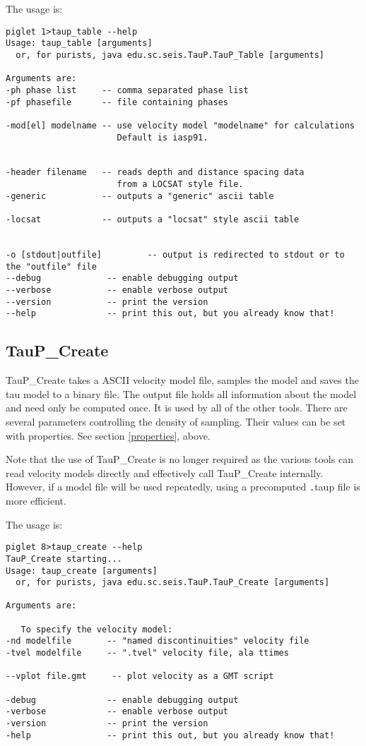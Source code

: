 The usage is:
\begin{verbatim}
piglet 1>taup_table --help
Usage: taup_table [arguments]
  or, for purists, java edu.sc.seis.TauP.TauP_Table [arguments]

Arguments are:
-ph phase list     -- comma separated phase list
-pf phasefile      -- file containing phases

-mod[el] modelname -- use velocity model "modelname" for calculations
                      Default is iasp91.


-header filename   -- reads depth and distance spacing data
                      from a LOCSAT style file.
-generic           -- outputs a "generic" ascii table

-locsat            -- outputs a "locsat" style ascii table


-o [stdout|outfile]         -- output is redirected to stdout or to the "outfile" file
--debug             -- enable debugging output
--verbose           -- enable verbose output
--version           -- print the version
--help              -- print this out, but you already know that!
\end{verbatim}

\subsection{TauP\_Create}

TauP\_Create takes a ASCII velocity model file, samples the model
 and saves the tau model to a binary file. 
The output file holds all 
information about the model and need only be computed once. It
is used by all of the other tools. There are several parameters controlling
the density of sampling. Their values can be set with properties. See section
\ref{properties}, above.

Note that the use of TauP\_Create is no longer required as the various tools can read velocity models directly
and effectively call TauP\_Create internally. However, if a model file will be used repeatedly, using a
precomputed {\texttt .taup} file is more efficient.

The usage is:
\begin{verbatim}
piglet 8>taup_create --help
TauP_Create starting...
Usage: taup_create [arguments]
  or, for purists, java edu.sc.seis.TauP.TauP_Create [arguments]

Arguments are:

   To specify the velocity model:
-nd modelfile       -- "named discontinuities" velocity file
-tvel modelfile     -- ".tvel" velocity file, ala ttimes

--vplot file.gmt     -- plot velocity as a GMT script

-debug              -- enable debugging output
-verbose            -- enable verbose output
-version            -- print the version
-help               -- print this out, but you already know that!
\end{verbatim} 
 

